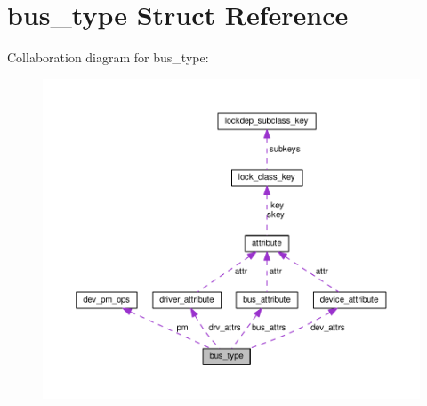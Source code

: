 \hypertarget{structbus__type}{}\section{bus\+\_\+type Struct Reference}
\label{structbus__type}


Collaboration diagram for bus\+\_\+type\+:
\nopagebreak
\begin{figure}[H]
\begin{center}
\leavevmode
\includegraphics[width=350pt]{structbus__type__coll__graph}
\end{center}
\end{figure}
